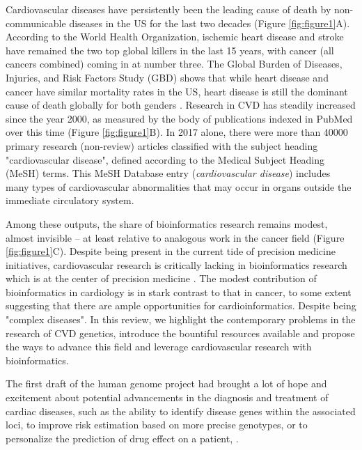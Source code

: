 \documentclass[letter]{bioinfo}
\begin{document}
Cardiovascular diseases have persistently been the leading cause of death by non-communicable diseases in the US for the last two decades (Figure \ref{fig:figure1}A).  According to the World Health Organization, ischemic heart disease and stroke have remained the two top global killers in the last 15 years, with cancer (all cancers combined) coming in at number three.  The Global Burden of Diseases, Injuries, and Risk Factors Study (GBD) shows that while heart disease and cancer have similar mortality rates in the US, heart disease is still the dominant cause of death globally for both genders \citep{Roth:2018:Global}.  Research in CVD has steadily increased since the year 2000, as measured by the body of publications indexed in PubMed over this time (Figure \ref{fig:figure1}B).  In 2017 alone, there were more than 40000 primary research (non-review) articles classified with the subject heading "cardiovascular disease", defined according to the Medical Subject Heading (MeSH) terms.  This MeSH Database entry (\textit{cardiovascular disease}) includes many types of cardiovascular abnormalities that may occur in organs outside the immediate circulatory system.


Among these outputs, the share of bioinformatics research remains modest, almost invisible -- at least relative to analogous work in the cancer field (Figure \ref{fig:figure1}C). Despite being present in the current tide of precision medicine initiatives, cardiovascular research is critically lacking in bioinformatics research which is at the center of precision medicine \citep{Gomez-Lopez:2017:Precision}.  The modest contribution of bioinformatics in cardiology is in stark contrast to that in cancer, to some extent suggesting that there are ample opportunities for cardioinformatics. Despite being "complex diseases". In this review, we highlight the contemporary problems in the research of CVD genetics, introduce the bountiful resources available and propose the ways to advance this field and leverage cardiovascular research with bioinformatics.

The first draft of the human genome project had brought a lot of hope and excitement about potential advancements in the diagnosis and treatment of cardiac diseases, such as the ability to identify disease genes within the associated loci, to improve risk estimation based on more precise genotypes, or to personalize the prediction of drug effect on a patient, \citep{Komajda:2001:heart}.
\end{document}
